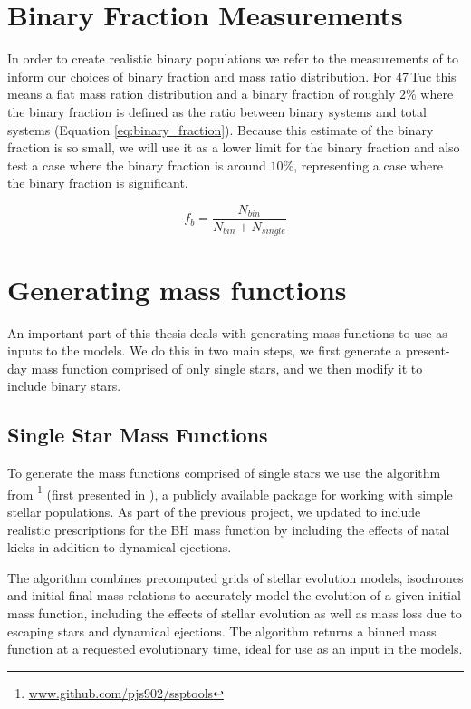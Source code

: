 \section{Binary Fraction Measurements}

In order to create realistic binary populations we refer to the measurements of \citet{Milone2012}
to inform our choices of binary fraction and mass ratio distribution. For 47\,Tuc this means a flat
mass ration distribution and a binary fraction of roughly $2\%$ where the binary fraction is defined
as the ratio between binary systems and total systems (Equation \ref{eq:binary_fraction}). Because this estimate of the
binary fraction is so small, we will use it as a lower limit for the binary fraction and also test a
case where the binary fraction is around $10\%$, representing a case where the binary fraction is
significant.

\begin{equation}
    f_b = \frac{N_{bin}}{N_{bin} + N_{single}}
    \label{eq:binary_fraction}
\end{equation}


\section{Generating mass functions}

An important part of this thesis deals with generating mass functions to use as inputs to the
 models. We do this in two main steps, we first generate a present-day mass function
comprised of only single stars, and we then modify it to include binary stars.

\subsection{Single Star Mass Functions}


To generate the mass functions comprised of single stars we use the \evolvemf{} algorithm from
\footnote{\url{www.github.com/pjs902/ssptools}} (first presented in
\citealt{Balbinot2018}), a publicly available package for working with simple stellar populations.
As part of the previous project, we updated \evolvemf{} to include realistic prescriptions for the BH
mass function by including the effects of natal kicks in addition to dynamical ejections.

The \evolvemf{} algorithm combines precomputed grids of stellar evolution models, isochrones and
initial-final mass relations to accurately model the evolution of a given initial mass function,
including the effects of stellar evolution as well as mass loss due to escaping stars and dynamical
ejections. The algorithm returns a binned mass function at a requested evolutionary time, ideal for
use as an input in the  models.

